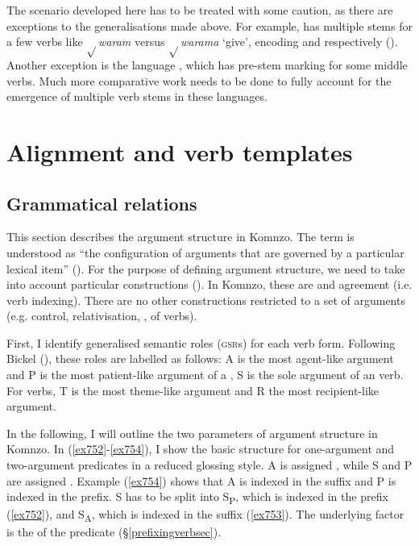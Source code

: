 The scenario developed here has to be treated with some caution, as there are exceptions to the generalisations made above. For example,  has multiple stems for a few verbs like $\sqrt{}$\emph{waram} versus $\sqrt{}$\emph{warama} `give', encoding  and   respectively (\citealt{Evans:nen}). Another exception is the  language , which has pre-stem  marking for some middle verbs. Much more comparative work needs to be done to fully account for the emergence of multiple verb stems in these languages.

\section{Alignment and verb templates} \label{alignmtemplates}

\subsection{Grammatical relations} \label{grammrel}

This section describes the argument structure in Komnzo. The term is understood as ``the configuration of arguments that are governed by a particular lexical item'' (\citealt[1130]{HaspelmathBardey:2004}). For the purpose of defining argument structure, we need to take into account particular constructions (\citealt[433]{Bickel:2011wo}). In Komnzo, these are  and agreement (i.e. verb indexing). There are no other constructions restricted to a set of arguments (e.g. control, relativisation, ,  of verbs).

First, I identify generalised semantic roles (\textsc{gsr}s) for each verb form. Following Bickel (\citeyear{Bickel:2011wo}), these roles are labelled as follows: A is the most agent-like argument and P is the most patient-like argument of a  , S is the sole argument of an  verb. For  verbs, T is the most theme-like argument and R the most recipient-like argument.

In the following, I will outline the two parameters of argument structure in Komnzo. In (\ref{ex752}-\ref{ex754}), I show the basic structure for one-argument and two-argument predicates in a reduced glossing style. A is assigned  , while S and P are assigned  . Example (\ref{ex754}) shows that A is indexed in the suffix and P is indexed in the prefix. S has to be split into S\textsubscript{P}, which is indexed in the prefix (\ref{ex752}), and S\textsubscript{A}, which is indexed in the suffix (\ref{ex753}). The underlying factor is the  of the predicate (\S\ref{prefixingverbsec}).

